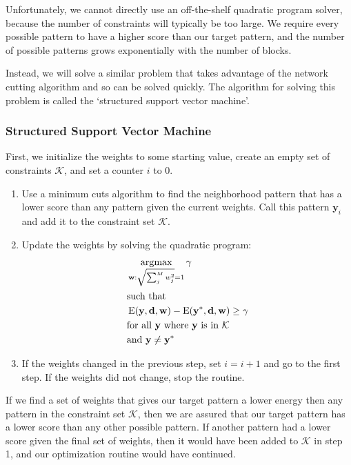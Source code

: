 Unfortunately, we cannot directly use an off-the-shelf quadratic
program solver, because the number of constraints will typically be
too large. We require every possible pattern to have a higher
score than our target pattern, and the number of possible patterns
grows exponentially with the number of blocks.

Instead, we will solve a similar problem that takes advantage of the
network cutting algorithm and so can be solved quickly. The algorithm
for solving this problem is called the `structured support vector
machine'\cite{szummer_learning_2008}.
 

\subsubsection{Structured Support Vector Machine}
First, we initialize the weights to some starting value, create an
empty set of constraints $\mathcal{K}$, and set a counter $i$ to $0$.
\begin{enumerate}
\item Use a minimum cuts algorithm to find the neighborhood pattern
  that has a lower score than any pattern given the current weights.
  Call this pattern $\mathbf{y}_i$ and add it to the constraint
  set $\mathcal{K}$.

\item Update the weights by solving the quadratic program: 
%
\begin{align*}
&\operatorname*{\arg\!\max}_{\mathbf{w}:\sqrt{\sum_j^M w_j^2}=1} \mathbf{\gamma} \\
&\text{such that} \\
&\operatorname{E}(\mathbf{y}, \mathbf{d}, \mathbf{w})
- \operatorname{E}(\mathbf{y}^*, \mathbf{d}, \mathbf{w}) \geq \gamma\\ 
&\text{for all } \mathbf{y} \text{ where } \mathbf{y} \text{ is in } \mathcal{K}\\
&\text{and } \mathbf{y} \neq \mathbf{y}^*
\end{align*}
%

\item If the weights changed in the previous step, set $i = i + 1$ and
  go to the first step. If the weights did not change, stop the routine.
\end{enumerate}

If we find a set of weights that gives our target pattern a lower
energy then any pattern in the constraint set $\mathcal{K}$, then we
are assured that our target pattern has a lower score than any other
possible pattern. If another pattern had a lower score given the final
set of weights, then it would have been added to $\mathcal{K}$ in step
1, and our optimization routine would have continued. 

